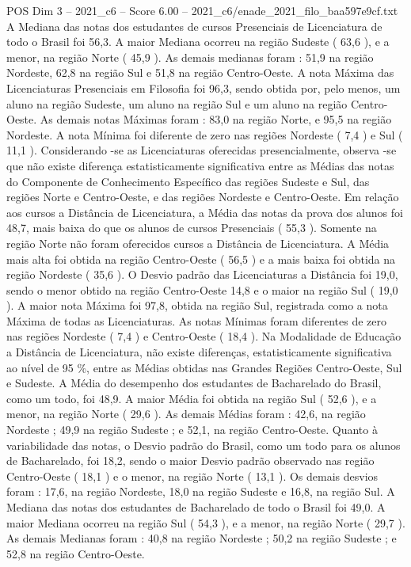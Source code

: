 \begin{textsample}{POS Dim 3 – 2021\_c6 – Score 6.00 – 2021\_c6/enade\_2021\_filo\_baa597e9cf.txt}
A Mediana das notas dos estudantes de cursos Presenciais de Licenciatura de todo o Brasil foi 56,3.
A maior Mediana ocorreu na região Sudeste ( 63,6 ), e a menor, na região Norte ( 45,9 ).
As demais medianas foram : 51,9 na região Nordeste, 62,8 na região Sul e 51,8 na região Centro-Oeste.
A nota Máxima das Licenciaturas Presenciais em Filosofia foi 96,3, sendo obtida por, pelo menos, um aluno na região Sudeste, um aluno na região Sul e um aluno na região Centro-Oeste.
As demais notas Máximas foram : 83,0 na região Norte, e 95,5 na região Nordeste.
A nota Mínima foi diferente de zero nas regiões Nordeste ( 7,4 ) e Sul ( 11,1 ).
Considerando -se as Licenciaturas oferecidas presencialmente, observa -se que não existe diferença estatisticamente significativa entre as Médias das notas do Componente de Conhecimento Específico das regiões Sudeste e Sul, das regiões Norte e Centro-Oeste, e das regiões Nordeste e Centro-Oeste.
Em relação aos cursos a Distância de Licenciatura, a Média das notas da prova dos alunos foi 48,7, mais baixa do que os alunos de cursos Presenciais ( 55,3 ).
Somente na região Norte não foram oferecidos cursos a Distância de Licenciatura.
A Média mais alta foi obtida na região Centro-Oeste ( 56,5 ) e a mais baixa foi obtida na região Nordeste ( 35,6 ).
O Desvio padrão das Licenciaturas a Distância foi 19,0, sendo o menor obtido na região Centro-Oeste 14,8 e o maior na região Sul ( 19,0 ).
A maior nota Máxima foi 97,8, obtida na região Sul, registrada como a nota Máxima de todas as Licenciaturas.
As notas Mínimas foram diferentes de zero nas regiões Nordeste ( 7,4 ) e Centro-Oeste ( 18,4 ).
Na Modalidade de Educação a Distância de Licenciatura, não existe diferenças, estatisticamente significativa ao nível de 95 \%, entre as Médias obtidas nas Grandes Regiões Centro-Oeste, Sul e Sudeste.
A Média do desempenho dos estudantes de Bacharelado do Brasil, como um todo, foi 48,9.
A maior Média foi obtida na região Sul ( 52,6 ), e a menor, na região Norte ( 29,6 ).
As demais Médias foram : 42,6, na região Nordeste ; 49,9 na região Sudeste ; e 52,1, na região Centro-Oeste.
Quanto à variabilidade das notas, o Desvio padrão do Brasil, como um todo para os alunos de Bacharelado, foi 18,2, sendo o maior Desvio padrão observado nas região Centro-Oeste ( 18,1 ) e o menor, na região Norte ( 13,1 ).
Os demais desvios foram : 17,6, na região Nordeste, 18,0 na região Sudeste e 16,8, na região Sul.
A Mediana das notas dos estudantes de Bacharelado de todo o Brasil foi 49,0.
A maior Mediana ocorreu na região Sul ( 54,3 ), e a menor, na região Norte ( 29,7 ).
As demais Medianas foram : 40,8 na região Nordeste ; 50,2 na região Sudeste ; e 52,8 na região Centro-Oeste.

\end{textsample}
